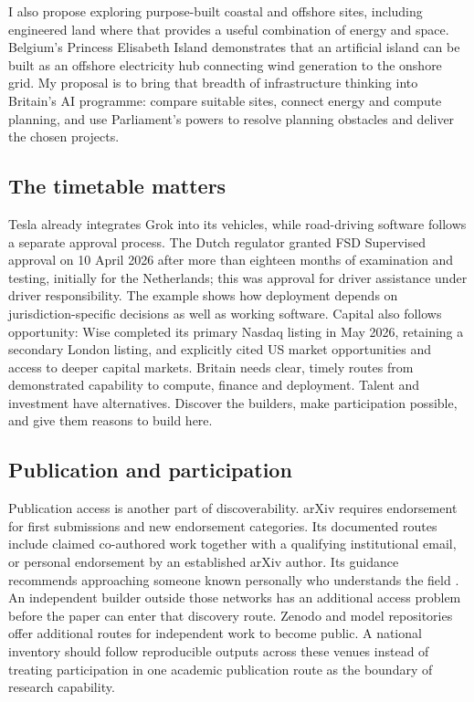 \documentclass[11pt,a4paper]{article}
\begin{document}
I also propose exploring purpose-built coastal and offshore sites, including engineered land where that provides a useful combination of energy and space. Belgium's Princess Elisabeth Island demonstrates that an artificial island can be built as an offshore electricity hub connecting wind generation to the onshore grid. My proposal is to bring that breadth of infrastructure thinking into Britain's AI programme: compare suitable sites, connect energy and compute planning, and use Parliament's powers to resolve planning obstacles and deliver the chosen projects. \cite{infraEnergyIsland}

\subsection{The timetable matters}
 Tesla already integrates Grok into its vehicles, while road-driving software follows a separate approval process. The Dutch regulator granted FSD Supervised approval on 10 April 2026 after more than eighteen months of examination and testing, initially for the Netherlands; this was approval for driver assistance under driver responsibility. The example shows how deployment depends on jurisdiction-specific decisions as well as working software. \cite{infraTeslaGrok,infraRDWFSD} Capital also follows opportunity: Wise completed its primary Nasdaq listing in May 2026, retaining a secondary London listing, and explicitly cited US market opportunities and access to deeper capital markets. \cite{infraWiseListing} Britain needs clear, timely routes from demonstrated capability to compute, finance and deployment. Talent and investment have alternatives. Discover the builders, make participation possible, and give them reasons to build here.

\subsection{Publication and participation}
Publication access is another part of discoverability. arXiv requires
endorsement for first submissions and new endorsement categories. Its
documented routes include claimed co-authored work together with a
qualifying institutional email, or personal endorsement by an established
arXiv author. Its guidance recommends approaching someone known personally
who understands the field \cite{arxivendorsement}. An independent builder
outside those networks has an additional access problem before the paper
can enter that discovery route. Zenodo and model repositories offer
additional routes for independent work to become public.
A national inventory should follow reproducible outputs across these venues
instead of treating participation in one academic publication route as the
boundary of research capability.
\end{document}
